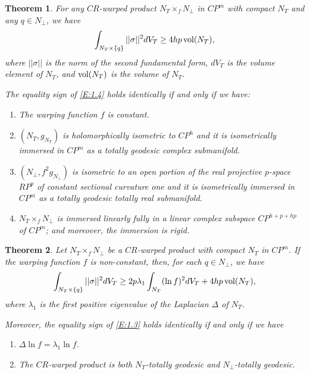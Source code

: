 \documentclass{amsart}
\theoremstyle{plain}
\newtheorem{theorem}{Theorem}[section]
\numberwithin{equation}{section}
\theoremstyle{remark}
\numberwithin{equation}{section}
\begin{document}
\begin{theorem} \label{T:10.3} For any $CR$-warped product $N_T\times_f N_\perp$ in $CP^m$ with compact $N_T$ and any $q\in N_\perp$, we have
\begin{align}\label{E:1.4}\int_{N_T\times\{q\}} ||\sigma||^2dV_{T}\geq 4hp\,\hbox{\rm vol}(N_T),\end{align} 
where $||\sigma||$ is the norm of the second fundamental form,  $dV_T$ is the volume element of $N_{T}$, and  $\hbox{\rm vol}(N_T)$ is the volume of $N_T$.

The equality sign of \eqref{E:1.4} holds
identically if and only if  we have:

\begin{enumerate}
\item The warping function $f$ is constant.

\item  $(N_T,g_{N_T})$ is holomorphically isometric to $CP^h$ and it is isometrically immersed in $CP^m$ as a totally geodesic complex submanifold.

\item $(N_\perp,f^2 g_{N_\perp})$ is isometric to an open portion of the real projective
$p$-space $RP^p$ of constant sectional curvature one  and it is isometrically immersed in
$CP^m$ as a totally geodesic totally real submanifold.

\item $N_T\times_f N_\perp$ is immersed linearly fully in a linear complex subspace $CP^{h+p+hp}$ of $CP^m$; and moreover, the immersion is rigid.
\end{enumerate}\end{theorem}

\begin{theorem} \label{T:10.4} Let $N_T\times_f N_\perp$ be a $CR$-warped product with compact $N_T$ in $CP^m$. If the warping function $f$ is non-constant, then, for each $q\in N_\perp$, we have
\begin{align}\label{E:1.3}\int_{N_T\times\{q\}} ||\sigma||^2dV_{T}\geq 2p\lambda_1 \int_{N_T}(\ln f)^2dV_T+ 4hp\,\hbox{\rm vol}(N_T),\end{align}  
where  $\lambda_1$  is the first positive eigenvalue of the Laplacian $\Delta$ of $N_T$.

Moreover, the equality sign of \eqref{E:1.3} holds identically if and only if  we have 

\begin{enumerate}
\item  $\Delta\ln f=\lambda_1 \ln f$.

\item The $CR$-warped product is both $N_T$-totally geodesic and $N_\perp$-totally geodesic.
\end{enumerate}\end{theorem}
\end{document}
